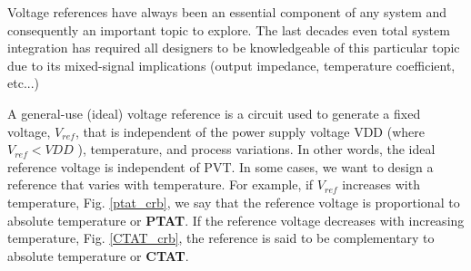 \documentclass[11pt,a4paper]{report}
\begin{document}
Voltage references have always been an essential component of any system and consequently an important topic to explore. The last decades  even total system integration has required all designers to be knowledgeable of this particular topic due to its mixed-signal implications (output impedance, temperature coefficient, etc...)


A general-use (ideal) voltage reference is a circuit used to generate a fixed voltage, $V_{ref}$, that is independent of the power supply voltage VDD (where $V_{ref} < VDD$ ), temperature, and process variations. In other words, the ideal reference voltage is independent of PVT. In some cases, we want to design a reference that varies with temperature. For example, if $V_{ref}$ increases with temperature, Fig. \ref{ptat_crb}, we say that the reference voltage is proportional to absolute temperature or \textbf{PTAT}. If the reference voltage decreases with increasing temperature,            Fig. \ref{CTAT_crb}, the reference is said to be complementary to absolute temperature or \textbf{CTAT}. 
\end{document}
